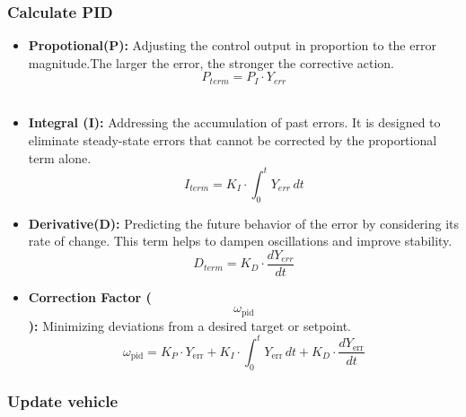     \subsubsection*{Calculate PID}
    \begin{itemize}
      \item \textbf{Propotional(P):} Adjusting the control output in proportion to the error magnitude.The larger the error, the stronger the corrective action.\\
        $$P_{term}=P_I \cdot Y_{err}$$\\
      \item \textbf{Integral (I):} Addressing the accumulation of past errors. It is designed to eliminate steady-state errors that cannot be corrected by the proportional term alone.\\
        $$I_{term} = K_I \cdot \int_{0}^{t} Y_{err} \, dt$$
      \item \textbf{Derivative(D):} Predicting the future behavior of the error by considering its rate of change. This term helps to dampen oscillations and improve stability.\\
        $$D_{term} = K_D\cdot\frac{d Y_{err}}{dt}$$   
      \item \textbf{Correction Factor ($$\omega_{\text{pid}}$$):} Minimizing deviations from a desired target or setpoint.
        $$\omega_{\text{pid}} = K_P \cdot Y_{\text{err}} + K_I \cdot \int_{0}^{t} Y_{\text{err}} \, dt + K_D \cdot \frac{dY_{\text{err}}}{dt}$$
    \end{itemize}
    \subsubsection*{Update vehicle}
